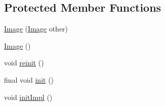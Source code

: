 \subsection*{Protected Member Functions}
\begin{DoxyCompactItemize}
\item 
\mbox{\hyperlink{classorg_1_1newdawn_1_1slick_1_1_image_a06e4c2fc918090322e8d00b09eeaba9c}{Image}} (\mbox{\hyperlink{classorg_1_1newdawn_1_1slick_1_1_image}{Image}} other)
\item 
\mbox{\hyperlink{classorg_1_1newdawn_1_1slick_1_1_image_a2c047fa669a8387f6c2d9bde33b3ee04}{Image}} ()
\item 
void \mbox{\hyperlink{classorg_1_1newdawn_1_1slick_1_1_image_ac959cc9bd3258690a9eb51359df1f6df}{reinit}} ()
\item 
final void \mbox{\hyperlink{classorg_1_1newdawn_1_1slick_1_1_image_a94d180c9218ba1444a0496a1898ec345}{init}} ()
\item 
void \mbox{\hyperlink{classorg_1_1newdawn_1_1slick_1_1_image_afc518253119ab1acad5e36b486e2f3f4}{init\+Impl}} ()
\end{DoxyCompactItemize}
